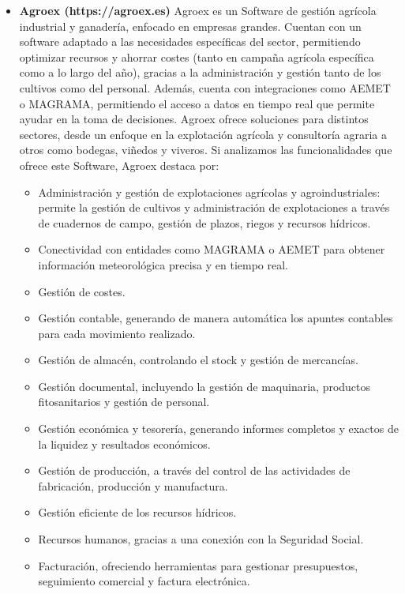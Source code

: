 \begin{itemize}
    \item \textbf{Agroex (https://agroex.es)}
    \newline
    Agroex es un Software de gestión agrícola industrial y ganadería, enfocado en empresas grandes. Cuentan con un software
    adaptado a las necesidades específicas del sector, permitiendo optimizar recursos y ahorrar costes (tanto en campaña
    agrícola específica como a lo largo del año), gracias a la administración y gestión tanto de los cultivos como del 
    personal. Además, cuenta con integraciones como AEMET o MAGRAMA, permitiendo el acceso a datos en tiempo real que 
    permite ayudar en la toma de decisiones.
    \newline
    Agroex ofrece soluciones para distintos sectores, desde un enfoque en la explotación agrícola y consultoría agraria
    a otros como bodegas, viñedos y viveros.
    \newline
    Si analizamos las funcionalidades que ofrece este Software, Agroex destaca por:
    \begin{itemize}
        \item Administración y gestión de explotaciones agrícolas y agroindustriales: permite la gestión de cultivos y 
        administración de explotaciones a través de cuadernos de campo, gestión de plazos, riegos y recursos hídricos.
        \item Conectividad con entidades como MAGRAMA o AEMET para obtener información meteorológica precisa y en tiempo real.
        \item Gestión de costes.
        \item Gestión contable, generando de manera automática los apuntes contables para cada movimiento realizado.
        \item Gestión de almacén, controlando el stock y gestión de mercancías.
        \item Gestión documental, incluyendo la gestión de maquinaria, productos fitosanitarios y gestión de personal.
        \item Gestión económica y tesorería, generando informes completos y exactos de la liquidez y resultados económicos.
        \item Gestión de producción, a través del control de las actividades de fabricación, producción y manufactura.
        \item Gestión eficiente de los recursos hídricos.
        \item Recursos humanos, gracias a una conexión con la Seguridad Social.
        \item Facturación, ofreciendo herramientas para gestionar presupuestos, seguimiento comercial y factura electrónica.
    \end{itemize}


\end{itemize}

